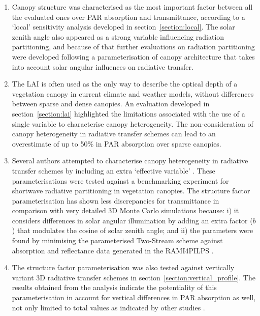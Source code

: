 \documentclass[a4paper,11pt]{report}
\begin{document}
\begin{enumerate}

\item Canopy structure was characterised as the most important factor between all the evaluated ones over PAR absorption and transmittance, according to a `local' sensitivity analysis developed in section~\ref{section:local}. The solar zenith angle also appeared as a strong variable influencing radiation partitioning, and because of that further evaluations on radiation partitioning were developed following a parameterisation of canopy architecture that takes into account solar angular influences on radiative transfer.

\item The LAI is often used as the only way to describe the optical depth of a vegetation canopy in current climate and weather models, without differences between sparse and dense canopies. An evaluation developed in section~\ref{section:lai} highlighted the limitations associated with the use of a single variable to characterise canopy heterogeneity. The non-consideration of canopy heterogeneity in radiative transfer schemes can lead to an overestimate of up to 50\% in PAR absorption over sparse canopies.

\item Several authors attempted to characterise canopy heterogeneity in radiative transfer schemes by including an extra `effective variable' \citep{Kucharik1999,pinty2006,Ni-Meister2010}. These parameterisations were tested against a benchmarking experiment for shortwave radiative partitioning in vegetation canopies. The structure factor parameterisation \citep{pinty2006} has shown less discrepancies for transmittance in comparison with very detailed 3D Monte Carlo simulations because: i) it considers differences in solar angular illumination by adding an extra factor ($b$) that modulates the cosine of solar zenith angle; and ii) the parameters were found by minimising the parameterised Two-Stream scheme against absorption and reflectance data generated in the RAMI4PILPS \citep{Widlowski2011}.

\item The structure factor parameterisation was also tested against vertically variant 3D radiative transfer schemes in section~\ref{section:vertical_profile}. The results obtained from the analysis indicate the potentiality of this parameterisation in account for vertical differences in PAR absorption as well, not only limited to total values as indicated by other studies \citep{pinty2006}.

\end{enumerate} 
\end{document}

